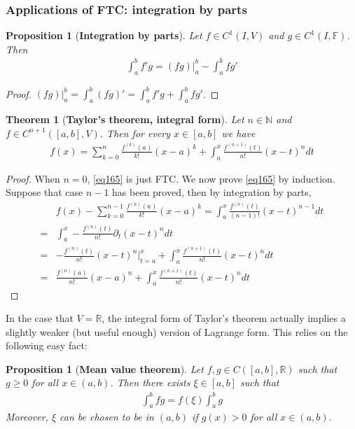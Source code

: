 \documentclass[12pt,b5paper,notitlepage]{article}
\theoremstyle{definition}
\theoremstyle{plain}
\newtheorem{thm}[df]{Theorem}
\newtheorem{pp}[df]{Proposition}
\newcommand{\Nbb}{\mathbb N}
\newcommand{\Rbb}{\mathbb R}
\newcommand{\Fbb}{\mathbb F}
\numberwithin{equation}{section}
\begin{document}
\subsubsection{Applications of FTC: integration by parts}




\begin{pp}[\textbf{Integration by parts}]  
Let $f\in C^1(I,V)$ and $g\in C^1(I,\Fbb)$. Then
\begin{align}
\int_a^b f'g=(fg)\big|_a^b-\int_a^b fg'
\end{align}
\end{pp}


\begin{proof}
$(fg)\big|_a^b=\int_a^b(fg)'=\int_a^bf'g+\int_a^b fg'$.
\end{proof}

\begin{thm}[\textbf{Taylor's theorem, integral form}] 
Let $n\in\Nbb$ and $f\in C^{n+1}([a,b],V)$. Then for every $x\in[a,b]$ we have
\begin{align}\label{eq165}
f(x)=\sum_{k=0}^n\frac{f^{(k)}(a)}{k!}(x-a)^k+\int_a^x\frac{f^{(n+1)}(t)}{n!}(x-t)^ndt
\end{align}
\end{thm}

\begin{proof}
When $n=0$, \eqref{eq165} is just FTC. We now prove \eqref{eq165} by induction. Suppose that case $n-1$ has been proved, then by integration by parts,
\begin{align*}
&f(x)-\sum_{k=0}^{n-1}\frac{f^{(k)}(a)}{k!}(x-a)^k=\int_a^x\frac{f^{(n)}(t)}{(n-1)!}(x-t)^{n-1}dt\\
=&\int_a^x -\frac{f^{(n)}(t)}{n!}\partial_t(x-t)^ndt\\
=&-\frac{f^{(n)}(t)}{n!}(x-t)^n\Big|_{t=a}^x+\int_a^x\frac{f^{(n+1)}(t)}{n!}(x-t)^ndt\\
=&\frac {f^{(n)}(a)}{n!}(x-a)^n+\int_a^x\frac{f^{(n+1)}(t)}{n!}(x-t)^ndt
\end{align*}
\end{proof}




In the case that $V=\Rbb$, the integral form of Taylor's theorem actually implies a slightly weaker (but useful enough) version of Lagrange form. This relies on the following easy fact:


\begin{pp}[\textbf{Mean value theorem}]
Let $f,g\in C([a,b],\Rbb)$ such that $g\geq 0$ for all $x\in(a,b)$. Then there exists $\xi\in [a,b]$ such that
\begin{align}
\int_a^bfg=f(\xi)\int_a^bg
\end{align}
Moreover, $\xi$ can be chosen to be in $(a,b)$ if $g(x)>0$ for all $x\in(a,b)$.
\end{pp}
\end{document}
